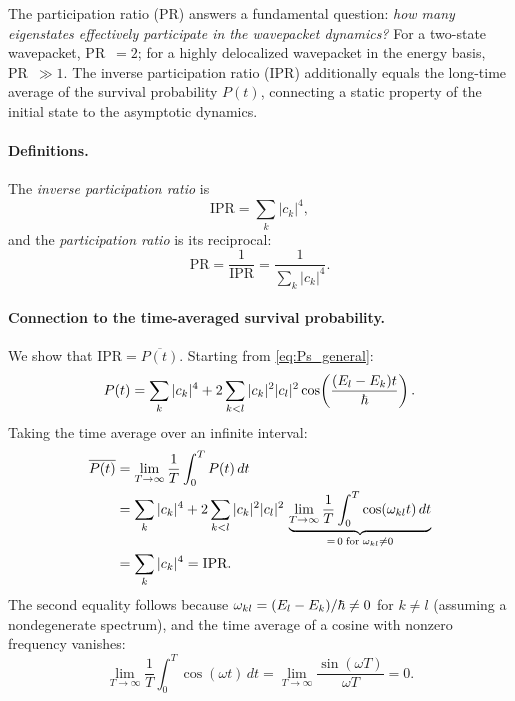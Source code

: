 \begin{remark}
The participation ratio (PR) answers a fundamental question: \emph{how many eigenstates effectively participate in the wavepacket dynamics?}
For a two-state wavepacket, PR~$=2$; for a highly delocalized wavepacket in the energy basis, PR~$\gg 1$.
The inverse participation ratio (IPR) additionally equals the long-time average of the survival probability $P(t)$, connecting a static property of the initial state to the asymptotic dynamics.
\end{remark}

\paragraph{Definitions.}

The \emph{inverse participation ratio} is
\begin{equation}\label{eq:IPR}
  \text{IPR} = \sum_k |c_k|^4,
\end{equation}
and the \emph{participation ratio} is its reciprocal:
\begin{equation}\label{eq:PR}
  \text{PR} = \frac{1}{\text{IPR}} = \frac{1}{\sum_k |c_k|^4}.
\end{equation}

\paragraph{Connection to the time-averaged survival probability.}

We show that $\text{IPR} = \overline{P(t)}$.
Starting from \cref{eq:Ps_general}:
\begin{equation}
  P(t) = \sum_k |c_k|^4 + 2\sum_{k<l}|c_k|^2|c_l|^2\cos\!\left(\frac{(E_l - E_k)t}{\hbar}\right).
\end{equation}
Taking the time average over an infinite interval:
\begin{align}
  \overline{P(t)}
  &= \lim_{T\to\infty}\frac{1}{T}\int_0^T P(t)\,dt\notag\\
  &= \sum_k |c_k|^4
  + 2\sum_{k<l}|c_k|^2|c_l|^2\,\underbrace{\lim_{T\to\infty}\frac{1}{T}\int_0^T\cos(\omega_{kl}t)\,dt}_{=\,0\;\text{for}\;\omega_{kl}\neq 0}\notag\\
  &= \sum_k |c_k|^4 = \text{IPR}.
  \label{eq:IPR_time_avg}
\end{align}
The second equality follows because $\omega_{kl} = (E_l - E_k)/\hbar \neq 0$ for $k \neq l$ (assuming a nondegenerate spectrum), and the time average of a cosine with nonzero frequency vanishes:
\begin{equation}
  \lim_{T\to\infty}\frac{1}{T}\int_0^T \cos(\omega t)\,dt
  = \lim_{T\to\infty}\frac{\sin(\omega T)}{\omega T} = 0.
\end{equation}

